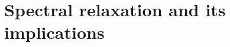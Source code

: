 \documentclass[12pt]{article}
\numberwithin{equation}{section}
\newcommand{\+}{%
	\raisebox{0.18ex}{\scaleobj{0.55}{+}}
}
\theoremstyle{definition}
\begin{document}

\section{Spectral relaxation and its implications}
%

\end{document}
